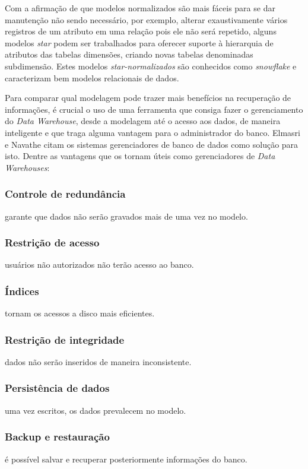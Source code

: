 \documentclass[conference]{IEEEtran}
\begin{document}
Com a afirmação de que modelos normalizados são mais fáceis para se dar manutenção não sendo necessário, por exemplo, alterar exaustivamente vários registros de um atributo em uma relação pois ele não será repetido, alguns modelos \textit{star} podem ser trabalhados para oferecer suporte à hierarquia de atributos das tabelas dimensões, criando novas tabelas denominadas subdimensão. Estes modelos \textit{star-normalizados} são conhecidos como \textit{snowflake} e caracterizam bem modelos relacionais de dados.

Para comparar qual modelagem pode trazer mais benefícios na recuperação de informações, é crucial o uso de uma ferramenta que consiga fazer o gerenciamento do \textit{Data Warehouse}, desde a modelagem até o acesso aos dados, de maneira inteligente e que traga alguma vantagem para o administrador do banco. Elmasri e Navathe \cite{navathe2011banco} citam os sistemas gerenciadores de banco de dados como solução para isto. Dentre as vantagens que os tornam úteis como gerenciadores de \textit{Data Warehouses}:

\subsubsection{Controle de redundância} garante que dados não serão gravados mais de uma vez no modelo.
\subsubsection{Restrição de acesso} usuários não autorizados não terão acesso ao banco.
\subsubsection{Índices} tornam os acessos a disco mais eficientes.
\subsubsection{Restrição de integridade} dados não serão inseridos de maneira inconsistente.
\subsubsection{Persistência de dados} uma vez escritos, os dados prevalecem no modelo.
\subsubsection{Backup e restauração} é possível salvar e recuperar posteriormente informações do banco.
\end{document}
